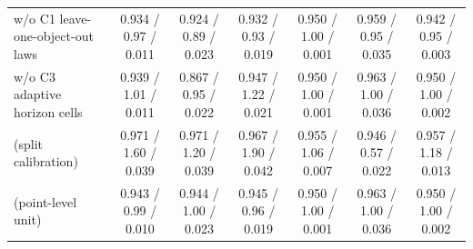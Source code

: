 \begin{table}[!htbp]
{\begin{tabular}{lcccccc}
w/o C1 leave-one-object-out laws & 0.934 / 0.97 / 0.011 & 0.924 / 0.89 / 0.023 & 0.932 / 0.93 / 0.019 & 0.950 / 1.00 / 0.001 & 0.959 / 0.95 / 0.035 & 0.942 / 0.95 / 0.003 \\
w/o C3 adaptive horizon cells & 0.939 / 1.01 / 0.011 & 0.867 / 0.95 / 0.022 & 0.947 / 1.22 / 0.021 & 0.950 / 1.00 / 0.001 & 0.963 / 1.00 / 0.036 & 0.950 / 1.00 / 0.002 \\
\gamut{} (split calibration) & 0.971 / 1.60 / 0.039 & 0.971 / 1.20 / 0.039 & 0.967 / 1.90 / 0.042 & 0.955 / 1.06 / 0.007 & 0.946 / 0.57 / 0.022 & 0.957 / 1.18 / 0.013 \\
\gamut{} (point-level unit) & 0.943 / 0.99 / 0.010 & 0.944 / 1.00 / 0.023 & 0.945 / 0.96 / 0.019 & 0.950 / 1.00 / 0.001 & 0.963 / 1.00 / 0.036 & 0.950 / 1.00 / 0.002 \\
\bottomrule
\end{tabular}}
\end{table}
